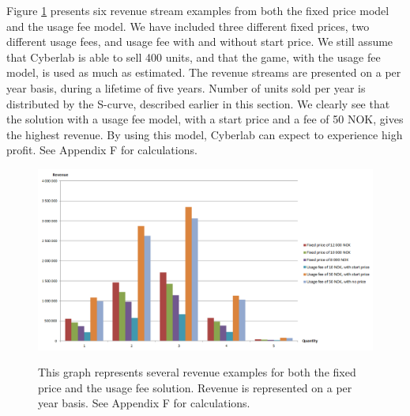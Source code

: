 Figure \ref{fig:RevenueAll} presents six revenue stream examples from both the fixed price model and the usage fee model. We have included three different fixed prices, two different usage fees, and usage fee with and without start price. We still assume that Cyberlab is able to sell 400 units, and that the game, with the usage fee model, is used as much as estimated. The revenue streams are presented on a per year basis, during a lifetime of five years. Number of units sold per year is distributed by the S-curve, described earlier in this section. We clearly see that the solution with a usage fee model, with a start price and a fee of 50 NOK, gives the highest revenue. By using this model, Cyberlab can expect to experience high profit. See Appendix F for calculations.  

\begin{figure}
\centering
\scalebox{0.55}
{\includegraphics{revenueall}}
\caption[Revenue examples for both fixed price model and usage fee model]{This graph represents several revenue examples for both the fixed price and the usage fee solution. Revenue is represented on a per year basis. See Appendix F for calculations.}
\label{fig:RevenueAll}
\end{figure}

